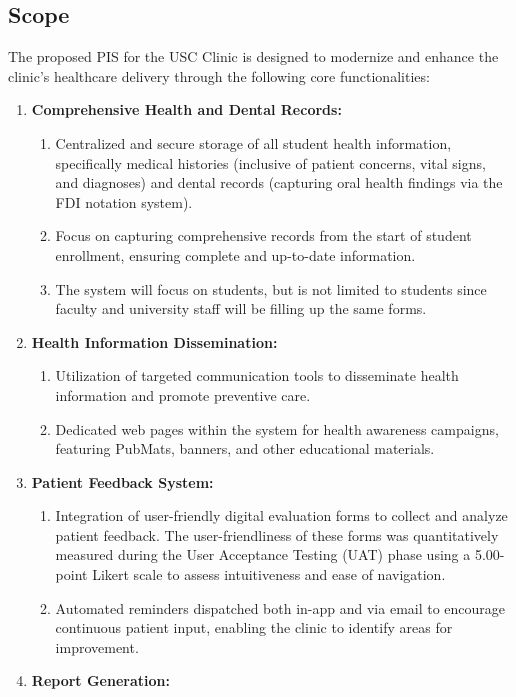 \subsection{Scope}
The proposed PIS for the USC Clinic is designed to modernize and enhance the clinic's healthcare delivery through the following core functionalities:
\begin{enumerate}
    \item \textbf{Comprehensive Health and Dental Records:}
    \begin{enumerate}
        \item Centralized and secure storage of all student health information, specifically medical histories (inclusive of patient concerns, vital signs, and diagnoses) and dental records (capturing oral health findings via the FDI notation system).
        \item Focus on capturing comprehensive records from the start of student enrollment, ensuring complete and up-to-date information.
        \item The system will focus on students, but is not limited to students since faculty and university staff will be filling up the same forms.
    \end{enumerate}
    \item \textbf{Health Information Dissemination:}
    \begin{enumerate}
        \item Utilization of targeted communication tools to disseminate health information and promote preventive care.
        \item Dedicated web pages within the system for health awareness campaigns, featuring PubMats, banners, and other educational materials.
    \end{enumerate}
    \item \textbf{Patient Feedback System:}
    \begin{enumerate}
        \item Integration of user-friendly digital evaluation forms to collect and analyze patient feedback. The user-friendliness of these forms was quantitatively measured during the User Acceptance Testing (UAT) phase using a 5.00-point Likert scale to assess intuitiveness and ease of navigation.
        \item Automated reminders dispatched both in-app and via email to encourage continuous patient input, enabling the clinic to identify areas for improvement.
    \end{enumerate}
    \item \textbf{Report Generation:}

\end{enumerate}

